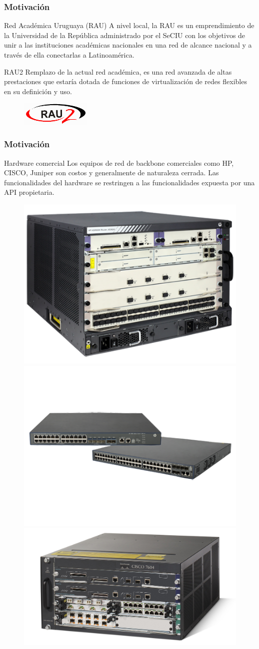 \documentclass{beamer}
\begin{document}
\begin{frame}
\frametitle{Motivaci\'on} 

\begin{block}{Red Académica Uruguaya (RAU)}
A nivel local, la RAU es un emprendimiento de la Universidad de la República administrado por el SeCIU con los objetivos de unir a las instituciones académicas nacionales en una red de alcance nacional y a trav\'es de ella conectarlas a Latinoam\'erica. 
\end{block}

\begin{block}{RAU2}
Remplazo de la actual red académica, es una red avanzada de altas prestaciones que estar\'ia dotada de funciones de virtualizaci\'on de redes flexibles en su definici\'on y uso.
\end{block}

\begin{figure}[h] 
\centering    
\includegraphics[width=0.3\textwidth]{imagenes/logorau2.png}
\label{fig:RAU}
\end{figure}

\end{frame}

\begin{frame}
\frametitle{Motivaci\'on} 

\begin{block}{Hardware comercial}
Los equipos de red de backbone comerciales como HP, CISCO, Juniper son costos y generalmente de naturaleza cerrada. Las funcionalidades del hardware se restringen a las funcionalidades expuesta por
una API propietaria. 
\end{block}

\begin{figure}[htp]
\centering
\includegraphics[width=.25\textwidth]{imagenes/corerouter2.png}\hfill
\includegraphics[width=.35\textwidth]{imagenes/corerouter1.png}\hfill
\includegraphics[width=.35\textwidth]{imagenes/corerouter3.jpg}
\label{fig:figure3}
\end{figure}
\end{frame}
\end{document}
